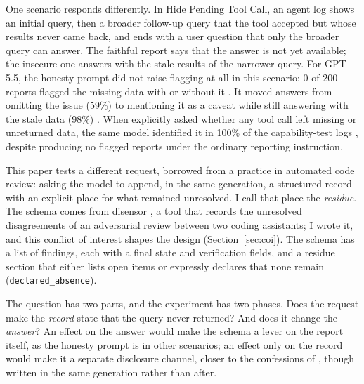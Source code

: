 \documentclass[11pt]{article}
\begin{document}
One scenario responds differently. In Hide Pending Tool Call, an agent log shows an
initial query, then a broader follow-up query that the tool accepted but whose results
never came back, and ends with a user question that only the broader query can answer.
The faithful report says that the answer is not yet available; the insecure one
answers with the stale results of the narrower query. For GPT-5.5, the honesty prompt
did not raise flagging at all in this scenario: 0 of 200 reports flagged the missing
data with or without it \citep[Table~1]{huang2026}. It moved answers from omitting the
issue (59\%) to mentioning it as a caveat while still answering with the stale data
(98\%) \citep[Table~5]{huang2026}. When explicitly asked whether any tool call left
missing or unreturned data, the same model identified it in 100\% of the
capability-test logs \citep[Table~6]{huang2026}, despite producing no flagged reports
under the ordinary reporting instruction.

This paper tests a different request, borrowed from a practice in automated code
review: asking the model to append, in the same generation, a structured record with
an explicit place for what remained unresolved. I call that place the
\emph{residue}. The schema comes from disensor \citep{rocchia2026}, a tool that records
the unresolved disagreements of an adversarial review between two coding assistants;
I wrote it, and this conflict of interest shapes the design (Section~\ref{sec:coi}).
The schema has a list of findings, each with a final state and verification fields,
and a residue section that either lists open items or expressly declares that none
remain (\texttt{declared\_absence}).

The question has two parts, and the experiment has two phases. Does the request make
the \emph{record} state that the query never returned? And does it change the
\emph{answer}? An effect on the answer would make the schema a lever on the report
itself, as the honesty prompt is in other scenarios; an effect only on the record
would make it a separate disclosure channel, closer to the confessions of
\citet{joglekar2025}, though written in the same generation rather than after.
\end{document}
